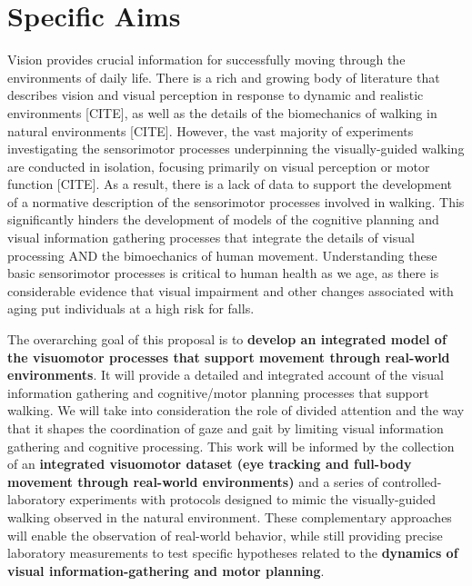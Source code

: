 
\section*{Specific Aims}


Vision provides crucial information for successfully moving through the environments of daily life.  There is a rich and growing body of literature that describes vision and visual perception in response to dynamic and realistic environments [CITE], as well as the details of the biomechanics of walking in natural environments [CITE].  However, the vast majority of experiments investigating the sensorimotor processes underpinning the visually-guided walking are conducted in isolation, focusing primarily on visual perception or motor function [CITE].  As a result, there is a lack of data to support the development of a normative description of the sensorimotor processes involved in walking.  This significantly hinders the development of models of the cognitive planning and visual information gathering processes that integrate the details of visual processing AND the bimoechanics of human movement. Understanding these basic sensorimotor processes is critical to human health as we age, as there is considerable evidence that visual impairment and other changes associated with aging put individuals at a high risk for falls.

The overarching goal of this proposal is to \textbf{develop an integrated model of the visuomotor processes that support movement through real-world environments}. It will provide a detailed and integrated account of the visual information gathering and cognitive/motor planning processes that support walking.  We will take into consideration the role of divided attention and the way that it shapes the coordination of gaze and gait by limiting visual information gathering and cognitive processing.  This work will be informed by the collection of an \textbf{integrated visuomotor dataset (eye tracking and full-body movement through real-world environments)} and a series of controlled-laboratory experiments with protocols designed to mimic the visually-guided walking observed in the natural environment.  These complementary approaches will enable the observation of real-world behavior, while still providing precise laboratory measurements to test specific hypotheses related to the \textbf{dynamics of visual information-gathering and motor planning}.  

